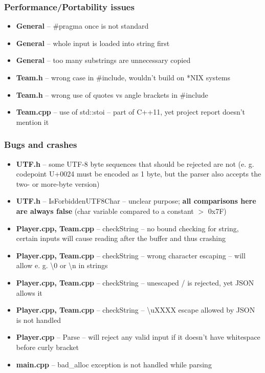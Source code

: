 \documentclass{beamer}
\begin{document}

\begin{frame}
\frametitle{Performance/Portability issues}

\begin{itemize}
\item \textbf{General} -- \#pragma once is not standard
\item \textbf{General} -- whole input is loaded into string first
\item \textbf{General} -- too many substrings are unnecessary copied
\item \textbf{Team.h} -- wrong case in \#include, wouldn't build on *NIX systems
\item \textbf{Team.h} -- wrong use of quotes vs angle brackets in \#include
\item \textbf{Team.cpp} -- use of std::stoi -- part of C++11, yet project report doesn't mention it
\end{itemize}

\end{frame}


\begin{frame}
\frametitle{Bugs and crashes}

\begin{itemize}
\item \textbf{UTF.h} -- some UTF-8 byte sequences that should be rejected are not (e. g. codepoint U+0024 must be encoded as 1 byte, but the parser also accepts the two- or more-byte version)
\item \textbf{UTF.h} -- IsForbiddenUTF8Char -- unclear purpose; \textbf{all comparisons here are always false} (char variable compared to a constant $>$ 0x7F)
\item \textbf{Player.cpp, Team.cpp} -- checkString -- no bound checking for string, certain inputs will cause reading after the buffer and thus crashing
\item \textbf{Player.cpp, Team.cpp} -- checkString -- wrong character escaping -- will allow e. g. \textbackslash 0 or \textbackslash n in strings
\item \textbf{Player.cpp, Team.cpp} -- checkString -- unescaped / is rejected, yet JSON allows it
\item \textbf{Player.cpp, Team.cpp} -- checkString -- \textbackslash uXXXX escape allowed by JSON is not handled
\item \textbf{Player.cpp} -- Parse -- will reject any valid input if it doesn't have whitespace before curly bracket
\item \textbf{main.cpp} -- bad\_alloc exception is not handled while parsing
\end{itemize}

\end{frame}
\end{document}
